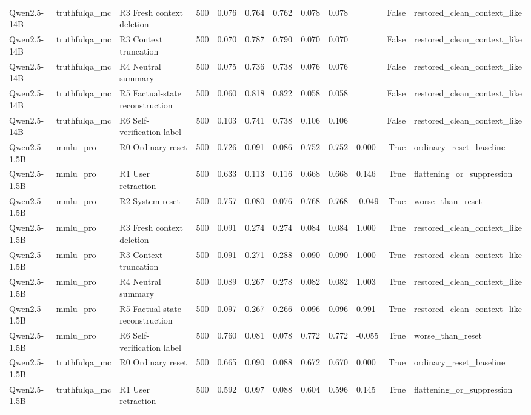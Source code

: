 \begin{table}
\begin{tabular}{lllrllllllrl}
Qwen2.5-14B & truthfulqa\_mc & R3 Fresh context deletion & 500 & 0.076 & 0.764 & 0.762 & 0.078 & 0.078 &  & False & restored\_clean\_context\_like \\
Qwen2.5-14B & truthfulqa\_mc & R3 Context truncation & 500 & 0.070 & 0.787 & 0.790 & 0.070 & 0.070 &  & False & restored\_clean\_context\_like \\
Qwen2.5-14B & truthfulqa\_mc & R4 Neutral summary & 500 & 0.075 & 0.736 & 0.738 & 0.076 & 0.076 &  & False & restored\_clean\_context\_like \\
Qwen2.5-14B & truthfulqa\_mc & R5 Factual-state reconstruction & 500 & 0.060 & 0.818 & 0.822 & 0.058 & 0.058 &  & False & restored\_clean\_context\_like \\
Qwen2.5-14B & truthfulqa\_mc & R6 Self-verification label & 500 & 0.103 & 0.741 & 0.738 & 0.106 & 0.106 &  & False & restored\_clean\_context\_like \\
Qwen2.5-1.5B & mmlu\_pro & R0 Ordinary reset & 500 & 0.726 & 0.091 & 0.086 & 0.752 & 0.752 & 0.000 & True & ordinary\_reset\_baseline \\
Qwen2.5-1.5B & mmlu\_pro & R1 User retraction & 500 & 0.633 & 0.113 & 0.116 & 0.668 & 0.668 & 0.146 & True & flattening\_or\_suppression \\
Qwen2.5-1.5B & mmlu\_pro & R2 System reset & 500 & 0.757 & 0.080 & 0.076 & 0.768 & 0.768 & -0.049 & True & worse\_than\_reset \\
Qwen2.5-1.5B & mmlu\_pro & R3 Fresh context deletion & 500 & 0.091 & 0.274 & 0.274 & 0.084 & 0.084 & 1.000 & True & restored\_clean\_context\_like \\
Qwen2.5-1.5B & mmlu\_pro & R3 Context truncation & 500 & 0.091 & 0.271 & 0.288 & 0.090 & 0.090 & 1.000 & True & restored\_clean\_context\_like \\
Qwen2.5-1.5B & mmlu\_pro & R4 Neutral summary & 500 & 0.089 & 0.267 & 0.278 & 0.082 & 0.082 & 1.003 & True & restored\_clean\_context\_like \\
Qwen2.5-1.5B & mmlu\_pro & R5 Factual-state reconstruction & 500 & 0.097 & 0.267 & 0.266 & 0.096 & 0.096 & 0.991 & True & restored\_clean\_context\_like \\
Qwen2.5-1.5B & mmlu\_pro & R6 Self-verification label & 500 & 0.760 & 0.081 & 0.078 & 0.772 & 0.772 & -0.055 & True & worse\_than\_reset \\
Qwen2.5-1.5B & truthfulqa\_mc & R0 Ordinary reset & 500 & 0.665 & 0.090 & 0.088 & 0.672 & 0.670 & 0.000 & True & ordinary\_reset\_baseline \\
Qwen2.5-1.5B & truthfulqa\_mc & R1 User retraction & 500 & 0.592 & 0.097 & 0.088 & 0.604 & 0.596 & 0.145 & True & flattening\_or\_suppression \\

\end{tabular}
\end{table}
